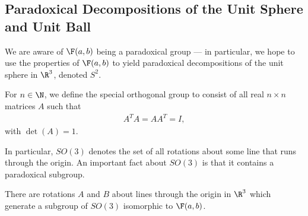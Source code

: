 \documentclass[12pt]{mypackage}
\begin{document}
\subsection{Paradoxical Decompositions of the Unit Sphere and Unit Ball}%
We are aware of $\F(a,b)$ being a paradoxical group --- in particular, we hope to use the properties of $\F(a,b)$ to yield paradoxical decompositions of the unit sphere in $\R^{3}$, denoted $S^{2}$.
\begin{definition}
  For $n\in \N$, we define the special orthogonal group to consist of all real $n\times n$ matrices $A$ such that
  \begin{align*}
    A^{T}A = AA^{T} = I,
  \end{align*}
  with $\det(A) = 1$.
\end{definition}
In particular, $SO(3)$ denotes the set of all rotations about some line that runs through the origin. An important fact about $SO(3)$ is that it contains a paradoxical subgroup.
\begin{theorem}
  There are rotations $A$ and $B$ about lines through the origin in $\R^3$ which generate a subgroup of $SO(3)$ isomorphic to $\F(a,b)$.
\end{theorem}
\end{document}
